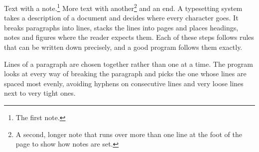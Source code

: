 \documentclass{article}
\begin{document}
Text with a note.\footnote{The first note.} More text with another\footnote{A second, longer
note that runs over more than one line at the foot of the page to show how notes are set.}
and an end.
A typesetting system takes a description of a document and decides where every character goes. It breaks paragraphs into lines, stacks the lines into pages and places headings, notes and figures where the reader expects them. Each of these steps follows rules that can be written down precisely, and a good program follows them exactly.

Lines of a paragraph are chosen together rather than one at a time. The program looks at every way of breaking the paragraph and picks the one whose lines are spaced most evenly, avoiding hyphens on consecutive lines and very loose lines next to very tight ones.
\end{document}
